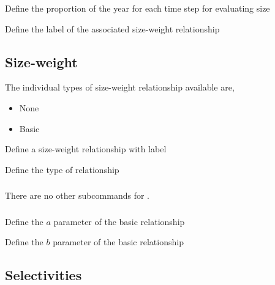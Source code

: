  {Define the proportion of the year for each time step for evaluating size}

 {Define the label of the associated size-weight relationship}

\subsection{Size-weight}

The individual types of size-weight relationship available are, 

\begin{itemize}
	\item None
	\item Basic
\end{itemize}

 {Define a size-weight relationship with label}

 {Define the type of relationship}

\subsubsection[None]{}

There are no other subcommands for .

\subsubsection[Basic]{}

 {Define the $a$ parameter of the basic relationship}

 {Define the $b$ parameter of the basic relationship}

\subsection{Selectivities}

